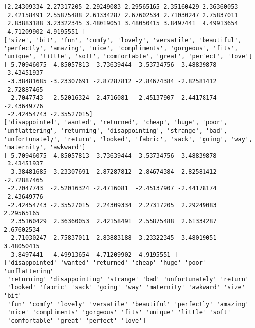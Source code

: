 \documentclass[11pt]{article}
\begin{document}
    \begin{Verbatim}[commandchars=\\\{\}]
[2.24309334 2.27317205 2.29249083 2.29565165 2.35160429 2.36360053
 2.42158491 2.55875488 2.61334287 2.67602534 2.71030247 2.75837011
 2.83883188 3.23322345 3.48019051 3.48050415 3.8497441  4.49913654
 4.71209902 4.9195551 ]
['size', 'bit', 'fun', 'comfy', 'lovely', 'versatile', 'beautiful', 'perfectly', 'amazing', 'nice', 'compliments', 'gorgeous', 'fits', 'unique', 'little', 'soft', 'comfortable', 'great', 'perfect', 'love']
[-5.70946075 -4.85057813 -3.73639444 -3.53734756 -3.48839878 -3.43451937
 -3.38481685 -3.23307691 -2.87287812 -2.84674384 -2.82581412 -2.72887465
 -2.7047743  -2.52016324 -2.4716081  -2.45137907 -2.44178174 -2.43649776
 -2.42454743 -2.35527015]
['disappointed', 'wanted', 'returned', 'cheap', 'huge', 'poor', 'unflattering', 'returning', 'disappointing', 'strange', 'bad', 'unfortunately', 'return', 'looked', 'fabric', 'sack', 'going', 'way', 'maternity', 'awkward']
[-5.70946075 -4.85057813 -3.73639444 -3.53734756 -3.48839878 -3.43451937
 -3.38481685 -3.23307691 -2.87287812 -2.84674384 -2.82581412 -2.72887465
 -2.7047743  -2.52016324 -2.4716081  -2.45137907 -2.44178174 -2.43649776
 -2.42454743 -2.35527015  2.24309334  2.27317205  2.29249083  2.29565165
  2.35160429  2.36360053  2.42158491  2.55875488  2.61334287  2.67602534
  2.71030247  2.75837011  2.83883188  3.23322345  3.48019051  3.48050415
  3.8497441   4.49913654  4.71209902  4.9195551 ]
['disappointed' 'wanted' 'returned' 'cheap' 'huge' 'poor' 'unflattering'
 'returning' 'disappointing' 'strange' 'bad' 'unfortunately' 'return'
 'looked' 'fabric' 'sack' 'going' 'way' 'maternity' 'awkward' 'size' 'bit'
 'fun' 'comfy' 'lovely' 'versatile' 'beautiful' 'perfectly' 'amazing'
 'nice' 'compliments' 'gorgeous' 'fits' 'unique' 'little' 'soft'
 'comfortable' 'great' 'perfect' 'love']

    \end{Verbatim}

    \begin{center}
    \end{center}
    { \hspace*{\fill} \\}
    
\end{document}
